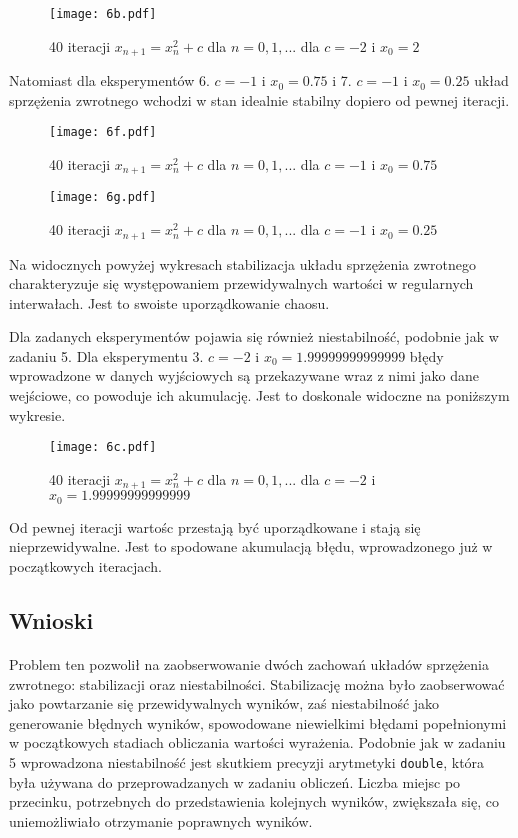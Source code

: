 \documentclass[a4paper]{article}
\begin{document}
\begin{figure}[htbp]
  \centering
  \texttt{[image: 6b.pdf]}
  \caption{40 iteracji $x_{n + 1} = x_{n}^2 + c$ dla $n = 0, 1, ...$ dla $c = -2$ i $x_{0} = 2$}
\end{figure}

Natomiast dla eksperymentów 6. $c = -1$ i $x_{0} = 0.75$ i 7. $c = -1$ i $x_{0} = 0.25$ układ sprzężenia zwrotnego wchodzi w stan idealnie stabilny dopiero od pewnej iteracji.

\begin{figure}[htbp]
  \centering
  \texttt{[image: 6f.pdf]}
  \caption{40 iteracji $x_{n + 1} = x_{n}^2 + c$ dla $n = 0, 1, ...$ dla $c = -1$ i $x_{0} = 0.75$}
\end{figure}
\clearpage
\begin{figure}[htbp]
  \centering
  \texttt{[image: 6g.pdf]}
  \caption{40 iteracji $x_{n + 1} = x_{n}^2 + c$ dla $n = 0, 1, ...$ dla $c = -1$ i $x_{0} = 0.25$}
\end{figure}

Na widocznych powyżej wykresach stabilizacja układu sprzężenia zwrotnego charakteryzuje się występowaniem przewidywalnych wartości w regularnych interwałach. Jest to swoiste uporządkowanie chaosu.

Dla zadanych eksperymentów pojawia się również niestabilność, podobnie jak w zadaniu 5. Dla eksperymentu 3. $c = -2$ i $x_{0} = 1.99999999999999$ błędy wprowadzone w danych wyjściowych są przekazywane wraz z nimi jako dane wejściowe, co powoduje ich akumulację. Jest to doskonale widoczne na poniższym wykresie.

\begin{figure}[htbp]
  \centering
  \texttt{[image: 6c.pdf]}
  \caption{40 iteracji $x_{n + 1} = x_{n}^2 + c$ dla $n = 0, 1, ...$ dla $c = -2$ i $x_{0} = 1.99999999999999$}
\end{figure}

Od pewnej iteracji wartośc przestają być uporządkowane i stają się nieprzewidywalne. Jest to spodowane akumulacją błędu, wprowadzonego już w początkowych iteracjach.
\subsection{Wnioski}
\paragraph{}
Problem ten pozwolił na zaobserwowanie dwóch zachowań układów sprzężenia zwrotnego: stabilizacji oraz niestabilności. Stabilizację można było zaobserwować jako powtarzanie się przewidywalnych wyników, zaś niestabilność jako generowanie błędnych wyników, spowodowane niewielkimi błędami popełnionymi w początkowych stadiach obliczania wartości wyrażenia. Podobnie jak w zadaniu 5 wprowadzona niestabilność jest skutkiem precyzji arytmetyki \texttt{double}, która była używana do przeprowadzanych w zadaniu obliczeń. Liczba miejsc po przecinku, potrzebnych do przedstawienia kolejnych wyników, zwiększała się, co uniemożliwiało otrzymanie poprawnych wyników.
\end{document}
